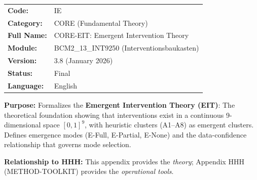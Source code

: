 \begin{tcolorbox}[colback=gray!5!white, colframe=gray!75!black,
    title=Appendix Header: IE CORE-EIT]

\begin{tabular}{@{}ll@{}}
\textbf{Code:} & IE \\
\textbf{Category:} & CORE (Fundamental Theory) \\
\textbf{Full Name:} & CORE-EIT: Emergent Intervention Theory \\
\textbf{Module:} & BCM2\_13\_INT9250 (Interventionsbaukasten) \\
\textbf{Version:} & 3.8 (January 2026) \\
\textbf{Status:} & Final \\
\textbf{Language:} & English \\
\end{tabular}

\vspace{0.5em}
\textbf{Purpose:} Formalizes the \textbf{Emergent Intervention Theory (EIT)}:
The theoretical foundation showing that interventions exist in a continuous
9-dimensional space $[0,1]^9$, with heuristic clusters (A1--A8) as emergent
clusters. Defines emergence modes (E-Full, E-Partial, E-None) and the
data-confidence relationship that governs mode selection.

\textbf{Relationship to HHH:} This appendix provides the \textit{theory};
Appendix HHH (METHOD-TOOLKIT) provides the \textit{operational tools}.

\end{tcolorbox}

%
%
%
%

